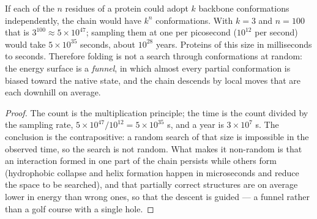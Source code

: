 \begin{theorem}\label{thm:b3:structural-biology:levinthal}
If each of the $n$ residues of a protein could adopt $k$ backbone
conformations independently, the chain would have $k^{n}$
conformations. With $k = 3$ and $n = 100$ that is $3^{100} \approx
5\times 10^{47}$; sampling them at one per picosecond ($10^{12}$ per
second) would take $5\times 10^{35}$ seconds, about $10^{28}$ years.
Proteins of this size  in milliseconds to seconds. Therefore
folding is not a search through conformations at random: the energy
surface is a \emph{funnel}, in which almost every partial conformation
is biased toward the native state, and the chain descends by local
moves that are each downhill on average.
\end{theorem}
\begin{proof}
The count is the multiplication principle; the time is the count
divided by the sampling rate, $5\times 10^{47}/10^{12} = 5\times
10^{35}$ s, and a year is $3\times 10^{7}$ s. The conclusion is the
contrapositive: a random search of that size is impossible in the
observed time, so the search is not random. What makes it non-random
is that an interaction formed in one part of the chain persists while
others form (hydrophobic collapse and helix formation happen in
microseconds and reduce the space to be searched), and that partially
correct structures are on average lower in energy than wrong ones, so
that the descent is guided --- a funnel rather than a golf course with a
single hole.
\end{proof}

